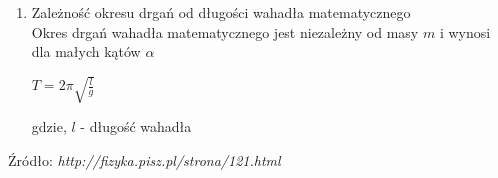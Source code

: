\documentclass[7pt]{article}
\begin{document}
\begin{enumerate}
\item \large{Zależność okresu drgań od długości wahadła matematycznego} \\
Okres drgań wahadła matematycznego jest niezależny od masy $m$ i wynosi dla małych kątów $\alpha$
\begin{center}
$T=2\pi \sqrt{\frac{l}{g}}$
\end{center}
\begin{small}
gdzie, $l$ - długość wahadła
\end{small}
\end{enumerate}
\begin{flushright}
\begin{scriptsize}
Źródło: \textit{http://fizyka.pisz.pl/strona/121.html}
\end{scriptsize}
\end{flushright}
\end{document}
